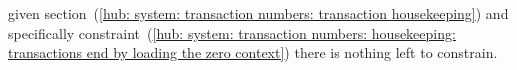 given
section~(\ref{hub: system: transaction numbers: transaction housekeeping}) and specifically
constraint~(\ref{hub: system: transaction numbers: housekeeping: transactions end by loading the zero context})
there is nothing left to constrain.
